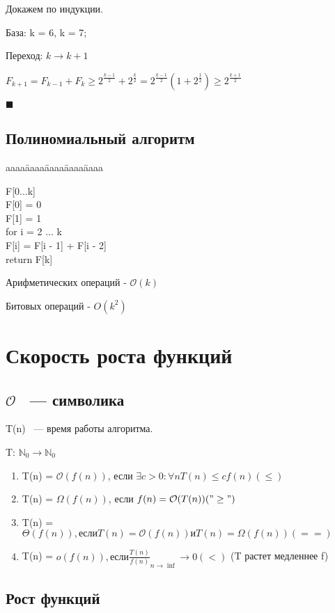 \documentclass[12pt]{article}
\def\t{\texttt}
\def\O{\mathcal{O}}
\newenvironment{MyTabbing}{
\t\bgroup
\begin{tabbing}
aaaa\=aaaa\=aaaa\=aaaa\=aaaa\kill
}{
\end{tabbing}
\t\egroup
}
\begin{document}
Докажем по индукции. 

База:  k = 6, k = 7;

Переход: $k \to k + 1$

   $F_{k + 1} = F_{k - 1} + F_k \ge 2^{\frac{k - 1}{2}} + 2^{\frac{k}{2}} = 2^{\frac{k - 1}{2}}\left(1 + 2^{\frac{1}{2}}\right) \ge 2^{\frac{k + 1}{2}}$

$\blacksquare$

\subsection{Полиномиальный алгоритм}
\begin{MyTabbing} 
F[0...k]\\
F[0] = 0\\
F[1] = 1\\
for i = 2 ... k\\
\>F[i] = F[i - 1] + F[i - 2]\\
return F[k]\\
\end{MyTabbing}

Арифметических операций - $\O(k)$

Битовых операций - $O(k ^ 2)$

\section{Скорость роста функций}
\subsection{$\O$ ~--- символика}

T(n) ~--- время работы алгоритма.

T: $\mathbb N_0 \to \mathbb N_0$

\begin{enumerate}
\item T(n) = $\O(f(n))$, если $\exists c > 0: \forall n T(n) \le c f(n) (\le)$
\item T(n) = $\Omega(f(n))$, если $f(n) = \O(T(n)) ("\ge")$ 
\item T(n) = $\Theta(f(n)), если T(n) = \O(f(n)) и T(n) = \Omega(f(n)) (==)$
\item T(n) = $o(f(n)), если \frac{T(n)}{f(n)}_{n \to \inf} \to 0 (<)$ (T растет медленнее f) 
\end{enumerate}

\subsection{Рост функций}
\end{document}
